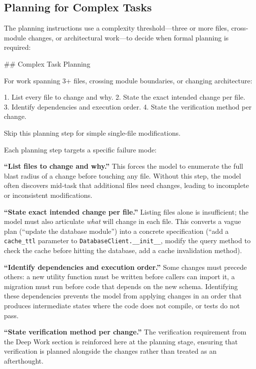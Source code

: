 \documentclass{article}
\begin{document}
\subsection{Planning for Complex Tasks}

The planning instructions use a complexity threshold---three or more files, cross-module changes, or architectural work---to decide when formal planning is required:

\begin{prompt}
## Complex Task Planning

For work spanning 3+ files, crossing module boundaries,
or changing architecture:

1. List every file to change and why.
2. State the exact intended change per file.
3. Identify dependencies and execution order.
4. State the verification method per change.

Skip this planning step for simple single-file
modifications.
\end{prompt}

\noindent Each planning step targets a specific failure mode:

\textbf{``List files to change and why.''}  This forces the model to enumerate the full blast radius of a change before touching any file.  Without this step, the model often discovers mid-task that additional files need changes, leading to incomplete or inconsistent modifications.

\textbf{``State exact intended change per file.''} Listing files alone is insufficient; the model must also articulate \emph{what} will change in each file.  This converts a vague plan (``update the database module'') into a concrete specification (``add a \texttt{cache\_ttl} parameter to \texttt{DatabaseClient.\_\_init\_\_}, modify the query method to check the cache before hitting the database, add a cache invalidation method).

\textbf{``Identify dependencies and execution order.''}  Some changes must precede others: a new utility function must be written before callers can import it, a migration must run before code that depends on the new schema.  Identifying these dependencies prevents the model from applying changes in an order that produces intermediate states where the code does not compile, or tests do not pass.

\textbf{``State verification method per change.''}  The verification requirement from the Deep Work section is reinforced here at the planning stage, ensuring that verification is planned alongside the changes rather than treated as an afterthought.
\end{document}
